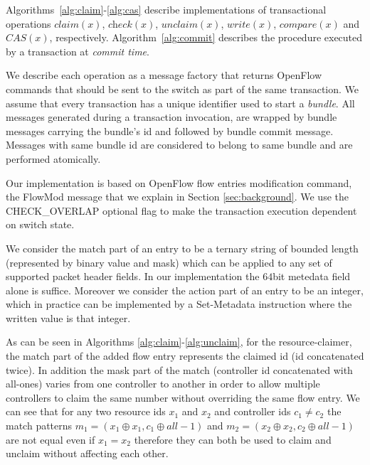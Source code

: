\documentclass[conference]{sigcomm-alternate}
\newcommand{\concat}[0]{\oplus}
\newcommand{\cas}{CAS\xspace}
\newcommand{\claimcheck}{check\xspace}
\newcommand{\compare}{compare\xspace}
\begin{document}
Algorithms~\ref{alg:claim}-\ref{alg:cas} describe implementations of  
transactional operations  $\textit{claim}(x)$, $\textit{\claimcheck}(x)$, $\textit{unclaim}(x)$, $\textit{write}(x)$,  $\textit{\compare}(x)$
and $\textit{\cas}(x)$, respectively. 
Algorithm~\ref{alg:commit} describes the procedure executed by
a transaction at \emph{commit time}.

We describe each operation as a message factory that returns OpenFlow commands that should be sent to the switch as part of the same transaction.
We assume that every transaction has a unique identifier  used to start a \emph{bundle}. 
All messages generated during a transaction invocation, are wrapped by bundle messages carrying the bundle's id and followed by bundle commit message.
Messages with same bundle id are considered to belong to same bundle and are performed atomically.


  
Our implementation is based on OpenFlow flow entries modification command, the FlowMod message that we explain in Section \ref{sec:background}. We use the CHECK\_OVERLAP optional flag to make the transaction execution dependent on switch state.    

We consider the match part of an entry to be a ternary string of bounded length (represented by binary value and mask) which can be applied to any set of supported packet header fields. In our implementation the $64$bit metedata field alone is suffice. Moreover we consider the action part of an entry to be an integer, which in practice can be implemented by a Set-Metadata instruction where the written value is that integer.
 
 As can be seen in Algorithms \ref{alg:claim}-\ref{alg:unclaim}, for the resource-claimer, 
  the match part of the added flow entry represents the claimed id (id concatenated twice).
   In addition the mask part of the match (controller id concatenated with all-ones) varies from one controller to another in order to allow multiple controllers to claim the same number without overriding the same flow entry. 
    We can see that for any two resource ids $x_1$ and $x_2$ and controller ids $c_1\neq c_2$ the match patterns $m_1=(x_1\concat x_1, c_1\concat all-1)$ and $ m_2=(x_2\concat x_2, c_2\concat all-1)$ are not equal even if $x_1=x_2$ therefore they can both be used to claim and unclaim without affecting each other.
\end{document}
